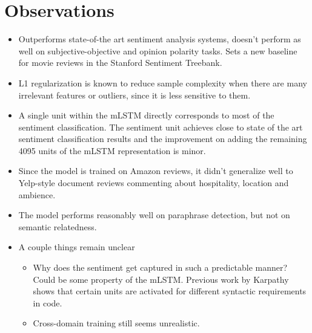 \documentclass[12pt]{article}
\begin{document}
\section{Observations}
  \begin{itemize}
    \item Outperforms state-of-the art sentiment analysis systems, doesn't perform as well on subjective-objective and opinion polarity tasks. Sets a new baseline for movie reviews in the Stanford Sentiment Treebank.
    \item L1 regularization is known to reduce sample complexity when there are many irrelevant features or outliers, since it is less sensitive to them.
    \item A single unit within the mLSTM directly corresponds to most of the sentiment classification. The sentiment unit achieves close to state of the art sentiment classification results and the improvement on adding the remaining 4095 units of the mLSTM representation is minor.
    \item Since the model is trained on Amazon reviews, it didn't generalize well to Yelp-style document reviews commenting about hospitality, location and ambience.
    \item The model performs reasonably well on paraphrase detection, but not on semantic relatedness.
    \item A couple things remain unclear
    \begin{itemize}
      \item Why does the sentiment get captured in such a predictable manner? Could be some property of the mLSTM. Previous work by Karpathy shows that certain units are activated for different syntactic requirements in code.
      \item Cross-domain training still seems unrealistic.
    \end{itemize}
  \end{itemize}
\end{document}
